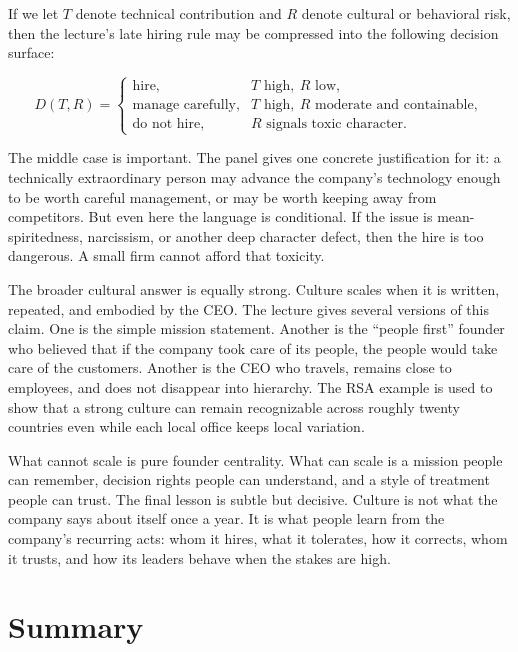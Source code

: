 If we let \(T\) denote technical contribution and \(R\) denote cultural or behavioral risk, then the lecture's late hiring rule may be compressed into the following decision surface:

\begin{equation}
D(T,R)=
\begin{cases}
\text{hire}, & T\text{ high},\ R\text{ low},\\
\text{manage carefully}, & T\text{ high},\ R\text{ moderate and containable},\\
\text{do not hire}, & R\text{ signals toxic character}.
\end{cases}
\end{equation}

The middle case is important. The panel gives one concrete justification for it: a technically extraordinary person may advance the company's technology enough to be worth careful management, or may be worth keeping away from competitors. But even here the language is conditional. If the issue is mean-spiritedness, narcissism, or another deep character defect, then the hire is too dangerous. A small firm cannot afford that toxicity.

The broader cultural answer is equally strong. Culture scales when it is written, repeated, and embodied by the CEO. The lecture gives several versions of this claim. One is the simple mission statement. Another is the ``people first'' founder who believed that if the company took care of its people, the people would take care of the customers. Another is the CEO who travels, remains close to employees, and does not disappear into hierarchy. The RSA example is used to show that a strong culture can remain recognizable across roughly twenty countries even while each local office keeps local variation.

What cannot scale is pure founder centrality. What can scale is a mission people can remember, decision rights people can understand, and a style of treatment people can trust. The final lesson is subtle but decisive. Culture is not what the company says about itself once a year. It is what people learn from the company's recurring acts: whom it hires, what it tolerates, how it corrects, whom it trusts, and how its leaders behave when the stakes are high.

\section{Summary}


